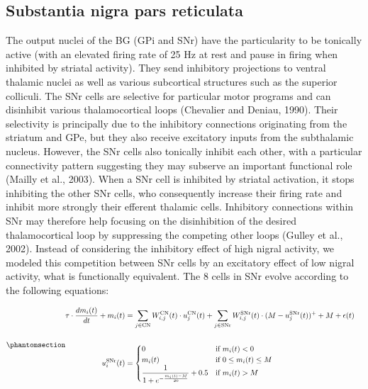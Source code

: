 \documentclass[
  11pt,
  a4paper,
]{scrbook}
\begin{document}
\subsection{Substantia nigra pars
reticulata}\label{substantia-nigra-pars-reticulata}

The output nuclei of the BG (GPi and SNr) have the particularity to be
tonically active (with an elevated firing rate of 25 Hz at rest and
pause in firing when inhibited by striatal activity). They send
inhibitory projections to ventral thalamic nuclei as well as various
subcortical structures such as the superior colliculi. The SNr cells are
selective for particular motor programs and can disinhibit various
thalamocortical loops (Chevalier and Deniau, 1990). Their selectivity is
principally due to the inhibitory connections originating from the
striatum and GPe, but they also receive excitatory inputs from the
subthalamic nucleus. However, the SNr cells also tonically inhibit each
other, with a particular connectivity pattern suggesting they may
subserve an important functional role (Mailly et al., 2003). When a SNr
cell is inhibited by striatal activation, it stops inhibiting the other
SNr cells, who consequently increase their firing rate and inhibit more
strongly their efferent thalamic cells. Inhibitory connections within
SNr may therefore help focusing on the disinhibition of the desired
thalamocortical loop by suppressing the competing other loops (Gulley et
al., 2002). Instead of considering the inhibitory effect of high nigral
activity, we modeled this competition between SNr cells by an excitatory
effect of low nigral activity, what is functionally equivalent. The 8
cells in SNr evolve according to the following equations:

\begin{equation}\phantomsection\label{eq-ficn:mp-snr}{
\begin{aligned}
    \tau \cdot \frac{d m_i(t)}{d t}  + m_i(t) & =   \displaystyle\sum_{j \in \text{CN}} W^{\text{CN}}_{i,j}(t) \cdot  u^{\text{CN}}_j(t) + \displaystyle\sum_{j \in \text{SNr}} W^{\text{SNr}}_{i,j}(t) \cdot  (M - u^{\text{SNr}}_j(t) )^+ + M + \epsilon(t) \nonumber\\ & &\\
    u^{\text{SNr}}_i(t) & =
     \begin{cases}
        0 & \text{if $m_i(t) < 0$}  \\
        m_i(t)  & \text{if $0 \leq m_i(t) \leq M$} \\
        \displaystyle\frac{1}{1 + e^{-\frac{m_i(t) - M}{20}}} + 0.5 & \text{if $m_i(t) > M$}
     \end{cases}
\end{aligned}
}\end{equation}
\end{document}

